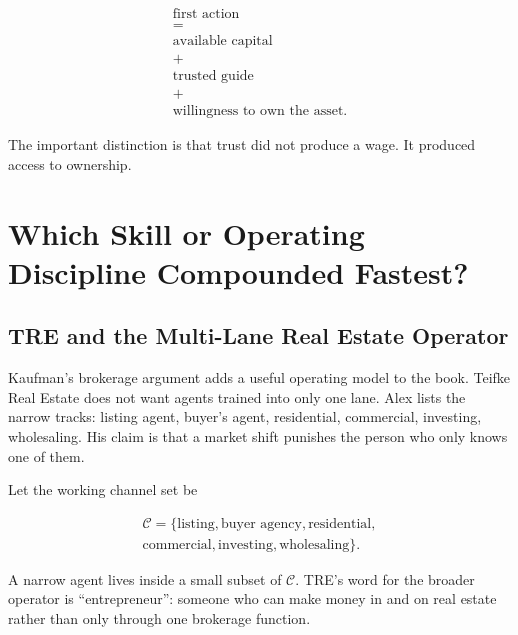 \documentclass[11pt,oneside]{book}
\begin{document}
\begin{equation}
\begin{gathered}
\text{first action}\\
=\\
\text{available capital}\\
+\\
\text{trusted guide}\\
+\\
\text{willingness to own the asset}.
\end{gathered}
\end{equation}

The important distinction is that trust did not produce a wage. It produced access to ownership.

\chapter{Which Skill or Operating Discipline Compounded Fastest?}

\section{TRE and the Multi-Lane Real Estate Operator}

Kaufman's brokerage argument adds a useful operating model to the book. Teifke Real Estate does not want agents trained into only one lane. Alex lists the narrow tracks: listing agent, buyer's agent, residential, commercial, investing, wholesaling. His claim is that a market shift punishes the person who only knows one of them.

Let the working channel set be

\begin{equation}
\begin{gathered}
\mathcal{C}=\{\text{listing},\text{buyer agency},\text{residential},\\
\text{commercial},\text{investing},\text{wholesaling}\}.
\end{gathered}
\end{equation}

A narrow agent lives inside a small subset of \(\mathcal{C}\). TRE's word for the broader operator is ``entrepreneur'': someone who can make money in and on real estate rather than only through one brokerage function.
\end{document}
